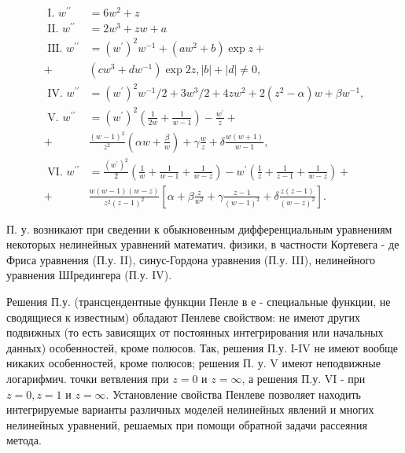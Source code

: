\documentclass[10pt]{article}
\begin{document}
\[

\begin{aligned}

\text { I. } w^{\prime \prime} & =6 w^{2}+z \\

\text { II. } w^{\prime \prime} & =2 w^{3}+z w+a \\

\text { III. } w^{\prime \prime} & =\left(w^{\prime}\right)^{2} w^{-1}+\left(a w^{2}+b\right) \exp z+ \\

+ & \left(c w^{3}+d w^{-1}\right) \exp 2 z,|b|+|d| \neq 0, \\

\text { IV. } w^{\prime \prime} & =\left(w^{\prime}\right)^{2} w^{-1} / 2+3 w^{3} / 2+4 z w^{2}+2\left(z^{2}-\alpha\right) w+\beta w^{-1}, \\

\text { V. } w^{\prime \prime} & =\left(w^{\prime}\right)^{2}\left(\frac{1}{2 w}+\frac{1}{w-1}\right)-\frac{w^{\prime}}{z}+ \\

+ & \frac{(w-1)^{2}}{z^{2}}\left(\alpha w+\frac{\beta}{w}\right)+\gamma \frac{w}{z}+\delta \frac{w(w+1)}{w-1}, \\

\text { VI. } w^{\prime \prime} & =\frac{\left(w^{\prime}\right)^{2}}{2}\left(\frac{1}{w}+\frac{1}{w-1}+\frac{1}{w-z}\right)-w^{\prime}\left(\frac{1}{z}+\frac{1}{z-1}+\frac{1}{w-z}\right)+ \\

+ & \frac{w(w-1)(w-z)}{z^{2}(z-1)^{2}}\left[\alpha+\beta \frac{z}{w^{2}}+\gamma \frac{z-1}{(w-1)^{2}}+\delta \frac{z(z-1)}{(w-z)^{2}}\right] .

\end{aligned}

\]



П. у. возникают при сведении к обыкновенным дифференциальным уравнениям некоторых нелинейных уравнений математич. физики, в частности Кортевега - де Фриса уравнения (П.у. II), синус-Гордона уравнения (П.у. III), нелинейного уравнения ШІредингера (П.у. IV).



Решения П.у. (трансцендентные функции Пенле в е - специальные функции, не сводящиеся к известным) обладают Пенлеве свойством: не имеют других подвижных (то есть зависящих от постоянных интегрирования или начальных данных) особенностей, кроме полюсов. Так, решения П.у. I-IV не имеют вообще никаких особенностей, кроме полюсов; решения П. у. V имеют неподвижные логарифмич. точки ветвления при $z=0$ и $z=\infty$, а решения П.у. VI - при $z=0, z=1$ и $z=\infty$. Установление свойства Пенлеве позволяет находить интегрируемые варианты различных моделей нелинейных явлений и многих нелинейных уравнений, решаемых при помощи обратной задачи рассеяния метода.
\end{document}
